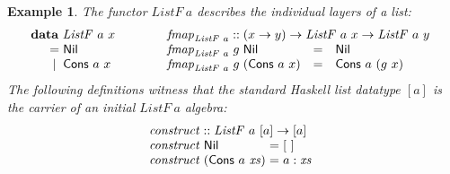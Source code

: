 \documentclass{jfp1}
\newtheorem{example}{Example}
\newcommand{\kw}[1]{\textbf{#1}}
\begin{document}
\begin{example}
  The functor $\mathit{ListF}~a$ describes the individual layers of a
  list:
  \begin{displaymath}
    \begin{array}{@{}l@{\hspace{3em}}l}
      \begin{array}{l}
        \kw{data}~\mathit{ListF}~a~x \\
        \quad
        \begin{array}{c@{\hspace{0.3em}}l}
          = & \mathsf{Nil} \\
          | & \mathsf{Cons}~a~x
        \end{array}
      \end{array}
      &
      \begin{array}{l}
        \mathit{fmap}_{\mathit{ListF}~a} :: (x \to y) \to \mathit{ListF}~a~x \to \mathit{ListF}~a~y \\
        \begin{array}{@{}l@{\hspace{0.3em}}l@{\hspace{0.3em}}lcl}
          \mathit{fmap}_{\mathit{ListF}~a}&g&\mathsf{Nil} &=& \mathsf{Nil} \\
          \mathit{fmap}_{\mathit{ListF}~a}&g&(\mathsf{Cons}~a~x) &=& \mathsf{Cons}~a~(g~x)
        \end{array}
      \end{array}
    \end{array}
  \end{displaymath}
  The following definitions witness that the standard Haskell list datatype
  $[a]$ is the carrier of an initial $\mathit{ListF}~a$ algebra:
  \begin{displaymath}
    \begin{array}{l}
      \mathit{construct} :: \mathit{ListF}~a~[a] \to [a] \\
      \begin{array}{@{}l@{\hspace{0.3em}}l@{\hspace{0.3em}}c@{\hspace{0.3em}}l}
        \mathit{construct}&\mathsf{Nil} &=& [~] \\
        \mathit{construct}&(\mathsf{Cons}~a~\mathit{xs}) &=& a : \mathit{xs}
      \end{array}
    \end{array}
  \end{displaymath}

\end{example}
\end{document}
